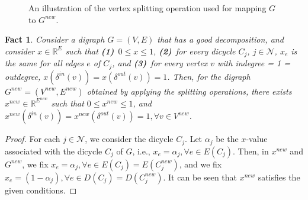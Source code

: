 \documentclass[11pt]{article}
\newtheorem{fact}[theorem]{Fact}
\newcommand \reals {\mathbb{R}}
\newcommand{\cindset}{\mathcal{N}}
\begin{document}
\begin{figure}
\begin{center}
\end{center}
\caption{ An illustration of the vertex splitting operation used for
	mapping $G$ to $G^{new}$.}
\label{fig:vertexsplit}
\end{figure}

\begin{fact}\label{fact:CorrectDeg}
Consider a digraph $G=(V,E)$ that has a good decomposition, and consider
$x\in \reals^{E}$ such that
\textbf{(1)}~$0 \leq x\leq 1$, \quad
\textbf{(2)}~for every dicycle $C_j$, $j\in\cindset$,
	$x_e$ is the same for all edges $e$ of $C_j$, and \quad
\textbf{(3)}~for every vertex $v$ with indegree = 1 = outdegree,
$x(\delta^{in}(v))=x(\delta^{out}(v))=1$.
Then, for the digraph $G^{new}=(V^{new},E^{new})$ obtained by
applying the splitting operations, there exists
$x^{new}\in \reals^{E^{new}}$ such that
$0 \leq x^{new}\leq 1$, and
$x^{new}(\delta^{in}(v))=x^{new}(\delta^{out}(v))=1, \forall v\in V^{new}$.
\end{fact}
\begin{proof}
For each $j\in\cindset$, we consider the dicycle $C_j$.
Let $\alpha_j$ be the $x$-value associated with the dicycle $C_j$ of $G$,
i.e., $x_e=\alpha_j, \forall e\in E(C_j)$.
Then, in $x^{new}$ and $G^{new}$,
we fix $x_e=\alpha_j, \forall e\in E(C_j)=E(C_j^{new})$, and
we fix $x_e=(1-\alpha_j), \forall e\in D(C_j)=D(C_j^{new})$.
It can be seen that $x^{new}$ satisfies the given conditions.
\end{proof}
\end{document}

